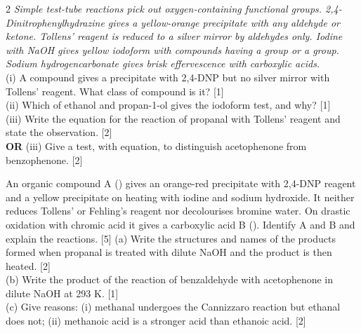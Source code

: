 \documentclass[10pt,a4paper]{extarticle}
\newcommand{\mk}[1]{{\scriptsize\color{black!55}[#1]}}
\begin{document}
\begin{multicols}{2}
\Q \textit{Simple test-tube reactions pick out oxygen-containing functional groups. 2,4-Dinitrophenylhydrazine gives a yellow-orange precipitate with any aldehyde or ketone. Tollens' reagent is reduced to a silver mirror by aldehydes only. Iodine with NaOH gives yellow iodoform with compounds having a  group or a  group. Sodium hydrogencarbonate gives brisk effervescence with carboxylic acids.}\\[2pt]
(i) A compound gives a precipitate with 2,4-DNP but no silver mirror with Tollens' reagent. What class of compound is it? \mk{1}\\
(ii) Which of ethanol and propan-1-ol gives the iodoform test, and why? \mk{1}\\
(iii) Write the equation for the reaction of propanal with Tollens' reagent and state the observation. \mk{2}\\
\textbf{OR} (iii) Give a test, with equation, to distinguish acetophenone from benzophenone. \mk{2}

\Q An organic compound A () gives an orange-red precipitate with 2,4-DNP reagent and a yellow precipitate on heating with iodine and sodium hydroxide. It neither reduces Tollens' or Fehling's reagent nor decolourises bromine water. On drastic oxidation with chromic acid it gives a carboxylic acid B (). Identify A and B and explain the reactions. \mk{5}
\Q (a) Write the structures and names of the products formed when propanal is treated with dilute NaOH and the product is then heated. \mk{2}\\
(b) Write the product of the reaction of benzaldehyde with acetophenone in dilute NaOH at 293 K. \mk{1}\\
(c) Give reasons: (i) methanal undergoes the Cannizzaro reaction but ethanal does not; (ii) methanoic acid is a stronger acid than ethanoic acid. \mk{2}
\end{multicols}
\end{document}
